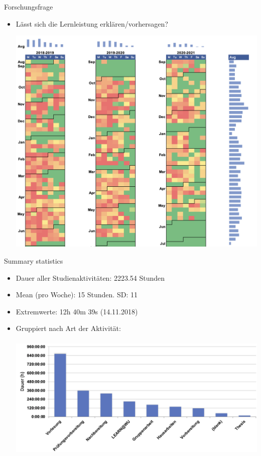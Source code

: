 \documentclass[
  ignorenonframetext,
]{beamer}
\begin{document}
\begin{frame}
\begin{block}{Forschungsfrage}
\protect\hypertarget{forschungsfrage}{}
\begin{itemize}
\item
  Lässt sich die Lernleistung erklären/vorhersagen?

  \includegraphics{images/heatmap-02.png}
\end{itemize}
\end{block}
\end{frame}

\begin{frame}
\begin{block}{Summary statistics}
\protect\hypertarget{summary-statistics}{}
\begin{itemize}
\item
  Dauer aller Studienaktivitäten: 2223.54 Stunden
\item
  Mean (pro Woche): 15 Stunden. SD: 11
\item
  Extremwerte: 12h 40m 39s (14.11.2018)
\item
  Gruppiert nach Art der Aktivität:\\
  ~\\

  \includegraphics{images/tags.png}
\end{itemize}
\end{block}
\end{frame}
\end{document}
